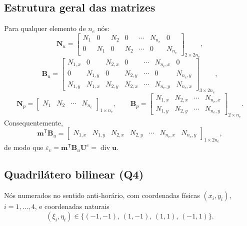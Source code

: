 \documentclass[11pt,a4paper]{article}
\newcommand{\Div}{\operatorname{div}}
\begin{document}
\subsection{Estrutura geral das matrizes}

Para qualquer elemento de $n_e$ nós:
\begin{equation*}
\boxed{\mathbf N_u=\begin{bmatrix}
N_1&0&N_2&0&\cdots&N_{n_e}&0\\
0&N_1&0&N_2&\cdots&0&N_{n_e}
\end{bmatrix}_{2\times2n_e},}
\end{equation*}
\begin{equation*}
\boxed{\mathbf B_u=\begin{bmatrix}
N_{1,x}&0&N_{2,x}&0&\cdots&N_{n_e,x}&0\\
0&N_{1,y}&0&N_{2,y}&\cdots&0&N_{n_e,y}\\
N_{1,y}&N_{1,x}&N_{2,y}&N_{2,x}&\cdots&N_{n_e,y}&N_{n_e,x}
\end{bmatrix}_{3\times2n_e},}
\end{equation*}
\begin{equation*}
\boxed{\mathbf N_p=\begin{bmatrix}N_1&N_2&\cdots&N_{n_e}\end{bmatrix}_{1\times n_e},
\qquad
\mathbf B_p=\begin{bmatrix}
N_{1,x}&N_{2,x}&\cdots&N_{n_e,x}\\
N_{1,y}&N_{2,y}&\cdots&N_{n_e,y}
\end{bmatrix}_{2\times n_e}.}
\end{equation*}
Consequentemente,
\begin{equation*}
\mathbf m^{\mathsf T}\mathbf B_u=\begin{bmatrix}N_{1,x}&N_{1,y}&N_{2,x}&N_{2,y}&\cdots&N_{n_e,x}&N_{n_e,y}\end{bmatrix}_{1\times2n_e},
\end{equation*}
de modo que $\varepsilon_v=\mathbf m^{\mathsf T}\mathbf B_u\mathbf U^e=\Div\mathbf u$.

\subsection{Quadrilátero bilinear (Q4)}

Nós numerados no sentido anti-horário, com coordenadas físicas
$(x_i,y_i)$, $i=1,\dots,4$, e coordenadas naturais
\begin{equation*}
(\xi_i,\eta_i)\in\{(-1,-1),\,(1,-1),\,(1,1),\,(-1,1)\}.
\end{equation*}
\end{document}
